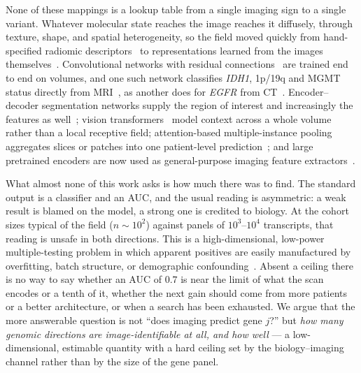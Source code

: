 \documentclass{article}
\begin{document}
None of these mappings is a lookup table from a single imaging sign to a single
variant. Whatever molecular state reaches the image reaches it diffusely,
through texture, shape, and spatial heterogeneity, so the field moved quickly
from hand-specified radiomic descriptors~\citep{lambin2012radiomics,aerts2014radiomics,vangriethuysen2017pyradiomics}
to representations learned from the images themselves~\citep{hosny2018ai,bi2019ai}.
Convolutional networks with residual connections~\citep{he2016resnet} are
trained end to end on volumes, and one such network classifies \emph{IDH1},
1p/19q and MGMT status directly from MRI~\citep{chang2018glioma}, as another
does for \emph{EGFR} from CT~\citep{wang2019egfr}. Encoder--decoder segmentation
networks supply the region of interest and increasingly the features as
well~\citep{ronneberger2015unet,isensee2021nnunet}; vision
transformers~\citep{dosovitskiy2021vit} model context across a whole volume
rather than a local receptive field; attention-based multiple-instance pooling
aggregates slices or patches into one patient-level
prediction~\citep{ilse2018abmil}; and large pretrained encoders are now used as
general-purpose imaging feature extractors~\citep{mei2022radimagenet,moor2023foundation}.

What almost none of this work asks is how much there was to find. The standard
output is a classifier and an AUC, and the usual reading is asymmetric: a weak
result is blamed on the model, a strong one is credited to biology. At the
cohort sizes typical of the field ($n\sim 10^2$) against panels of
$10^3$--$10^4$ transcripts, that reading is unsafe in both directions. This is a
high-dimensional, low-power multiple-testing problem in which apparent positives
are easily manufactured by overfitting, batch structure, or demographic
confounding~\citep{chalkidou2015fdr,welch2019vulnerabilities}. Absent a ceiling
there is no way to say whether an AUC of $0.7$ is near the limit of what the
scan encodes or a tenth of it, whether the next gain should come from more
patients or a better architecture, or when a search has been exhausted. We argue
that the more answerable question is not ``does imaging predict gene $j$?'' but
\emph{how many genomic directions are image-identifiable at all, and how well}
--- a low-dimensional, estimable quantity with a hard ceiling set by the
biology--imaging channel rather than by the size of the gene panel.
\end{document}
